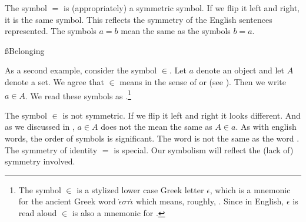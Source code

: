 The symbol $=$ is (appropriately) a symmetric symbol.
If we flip it left and right, it is the same symbol.
This reflects the symmetry of the English sentences represented.
The symbols $a = b$ mean the same as the symbols $b = a$.

%

\ss{Belonging}

As a second example, consider the symbol $\in$.
Let $a$ denote an object and let $A$ denote a set.
We agree that $\in$ means  in the sense of  or  (see ).
Then we write $a \in A$.
We read these symbols as .\footnote{The symbol $\in$ is a stylized lower case Greek letter $\epsilon$, which is a mnemonic for the ancient Greek word $\grave{\epsilon} \sigma \tau \acute{\iota}$ which means, roughly, .
Since in English, $\epsilon$ is read aloud  $\in$ is also a mnemonic for .}

The symbol $\in$ is not symmetric.
If we flip it left and right it looks different.
And as we discussed in , $a \in A$ does not the mean the same as $A \in a$.
As with english words, the order of symbols is significant. 
The word  is not the same as the word .
The symmetry of identity $=$ is special.
Our symbolism will reflect the (lack of) symmetry involved.


%
%
%

